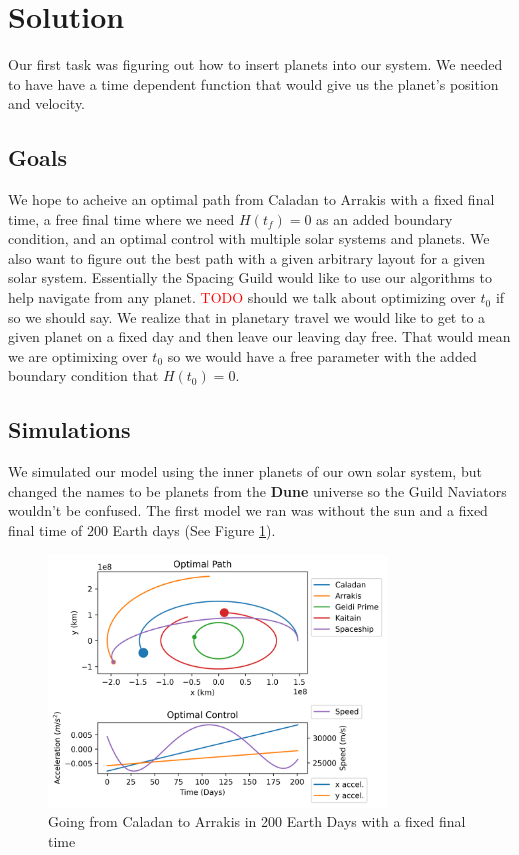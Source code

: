 \documentclass[11pt]{amsart}
\begin{document}
\section{Solution}
Our first task was figuring out how to insert planets into our system. We needed to have have a time dependent function that would give us the planet's position and velocity. 

\subsection{Goals}
We hope to acheive an optimal path from Caladan to Arrakis with a fixed final time, a free final time where we need $H(t_f) = 0$ as an added boundary condition, and an optimal control
with multiple solar systems and planets. We also want to figure out the best path with a given arbitrary layout for a given solar system. Essentially the Spacing Guild would like to use 
our algorithms to help navigate from any planet. \textcolor{red}{TODO} should we talk about optimizing over $t_0$ if so we should say. We realize that in planetary travel we would like to 
get to a given planet on a fixed day and then leave our leaving day free. That would mean we are optimixing over $t_0$ so we would have a free parameter with the added boundary condition that
$H(t_0) = 0$.


\subsection{Simulations}
We simulated our model using the inner planets of our own solar system, but changed the names to be planets from the \textbf{Dune} universe so the Guild Naviators wouldn't be confused.
The first model we ran was without the sun and a fixed final time of $200$ Earth days (See Figure \ref{fig:fixed_time_no_sun}). 

\begin{figure}[htp]
    \centering
    \includegraphics[width=0.8\textwidth]{f2.png}\hfill
    \caption{Going from Caladan to Arrakis in 200 Earth Days with a fixed final time}
    \label{fig:fixed_time_no_sun}
\end{figure}
\end{document}
